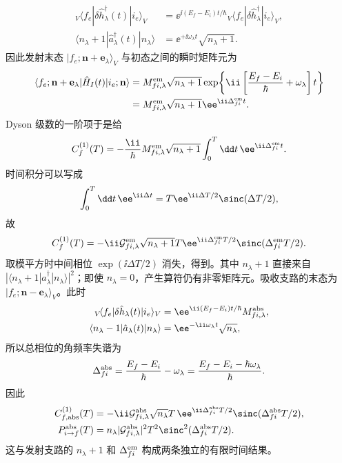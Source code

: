 \begin{derivation}
\begin{align*}
{}_V\!\langle f_e|\delta\hat h_\lambda^\dagger(t)|i_e\rangle_V
&=\ee^{\ii(E_f-E_i)t/\hbar}
{}_V\!\langle f_e|\delta\hat h_\lambda^\dagger|i_e\rangle_V,\\
\langle n_\lambda+1|\hat a_\lambda^\dagger(t)|n_\lambda\rangle
&=\ee^{+\ii\omega_\lambda t}\sqrt{n_\lambda+1}.
\end{align*}
因此发射末态 $|f_e;\mathbf n+\mathbf e_\lambda\rangle_V$ 与初态之间的瞬时矩阵元为
\begin{align*}
\langle f_e;\mathbf n+\mathbf e_\lambda|\hat H_I(t)|i_e;\mathbf n\rangle
&=M_{fi,\lambda}^{\rm em}\sqrt{n_\lambda+1}
\exp\!\left\{\ii\left[\frac{E_f-E_i}{\hbar}+\omega_\lambda\right]t\right\}\\
&=M_{fi,\lambda}^{\rm em}\sqrt{n_\lambda+1}
\ee^{\ii\Delta_{fi}^{\rm em}t}.
\end{align*}
Dyson 级数的一阶项于是给
\[
C_f^{(1)}(T)
=-\frac{\ii}{\hbar}M_{fi,\lambda}^{\rm em}\sqrt{n_\lambda+1}
\int_0^T\dd t\,\ee^{\ii\Delta_{fi}^{\rm em}t}.
\]
时间积分可以写成
\[
\int_0^T\dd t\,\ee^{\ii\Delta t}
=T\ee^{\ii\Delta T/2}\sinc(\Delta T/2),
\]
故
\[
C_f^{(1)}(T)
=-\ii\mathcal G_{fi,\lambda}^{\rm em}\sqrt{n_\lambda+1}
T\ee^{\ii\Delta_{fi}^{\rm em}T/2}
\sinc(\Delta_{fi}^{\rm em}T/2).
\]
取模平方时中间相位 $\exp(\ii\Delta T/2)$ 消失，得到。其中 $n_\lambda+1$ 直接来自 $|\langle n_\lambda+1|a_\lambda^\dagger|n_\lambda\rangle|^2$；即使 $n_\lambda=0$，产生算符仍有非零矩阵元。吸收支路的末态为 $|f_e;\mathbf n-\mathbf e_\lambda\rangle_V$。此时
\begin{align*}
{}_V\!\langle f_e|\delta\hat h_\lambda(t)|i_e\rangle_V
&=\ee^{\ii(E_f-E_i)t/\hbar}M_{fi,\lambda}^{\rm abs},\\
\langle n_\lambda-1|\hat a_\lambda(t)|n_\lambda\rangle
&=\ee^{-\ii\omega_\lambda t}\sqrt{n_\lambda},
\end{align*}
所以总相位的角频率失谐为
\[
 \Delta_{fi}^{\rm abs}
 =\frac{E_f-E_i}{\hbar}-\omega_\lambda
 =\frac{E_f-E_i-\hbar\omega_\lambda}{\hbar}.
\]
因此
\begin{align*}
 C_{f,\rm abs}^{(1)}(T)
 &=-\ii\mathcal G_{fi,\lambda}^{\rm abs}\sqrt{n_\lambda}
 T\,\ee^{\ii\Delta_{fi}^{\rm abs}T/2}
 \sinc(\Delta_{fi}^{\rm abs}T/2),\\
 P_{i\to f}^{\rm abs}(T)
 &=n_\lambda|\mathcal G_{fi,\lambda}^{\rm abs}|^2T^2
 \sinc^2(\Delta_{fi}^{\rm abs}T/2).
\end{align*}
这与发射支路的 $n_\lambda+1$ 和 $\Delta_{fi}^{\rm em}$ 构成两条独立的有限时间结果。
\end{derivation}

